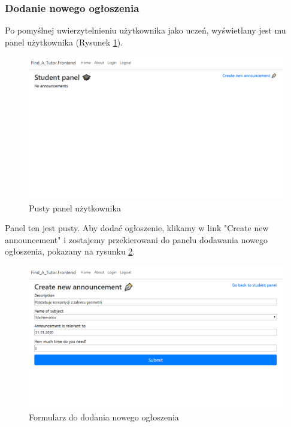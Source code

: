 \documentclass[12pt]{article}
\numberwithin{figure}{section}
\begin{document}
\begin{sloppypar}
\subsubsection{Dodanie nowego ogłoszenia}
Po pomyślnej uwierzytelnieniu użytkownika jako uczeń, wyświetlany jest mu panel użytkownika (Rysunek \ref{fig:student-empty}).
\begin{figure}[H] 
    \centering
    \includegraphics[width=1\textwidth]{images/chapter_4/student-empty.png}
    \caption{Pusty panel użytkownika}
    \label{fig:student-empty}
\end{figure}

Panel ten jest pusty. Aby dodać ogłoszenie, klikamy w link "Create new announcement" i zostajemy przekierowani do panelu dodawania nowego ogłoszenia, pokazany na rysunku \ref{fig:create-new}.
\begin{figure}[H] 
    \centering
    \includegraphics[width=1\textwidth]{images/chapter_4/create-new.png}
    \caption{Formularz do dodania nowego ogłoszenia}
    \label{fig:create-new}
\end{figure}


\end{sloppypar}
\end{document}

